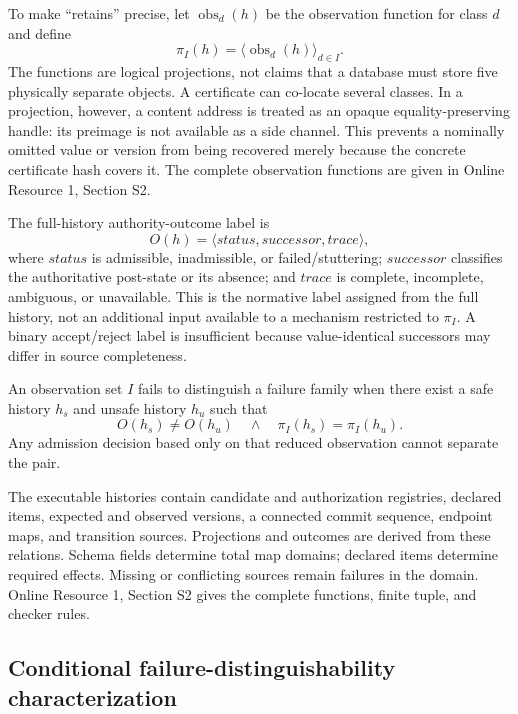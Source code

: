 To make ``retains'' precise, let $\operatorname{obs}_d(h)$ be the observation function for class $d$ and define
\begin{equation}
\pi_I(h)=\langle\operatorname{obs}_d(h)\rangle_{d\in I}.
\label{eq:observation-projection}
\end{equation}
The functions are logical projections, not claims that a database must store five physically separate objects. A certificate can co-locate several classes. In a projection, however, a content address is treated as an opaque equality-preserving handle: its preimage is not available as a side channel. This prevents a nominally omitted value or version from being recovered merely because the concrete certificate hash covers it. The complete observation functions are given in Online Resource 1, Section S2.

The full-history authority-outcome label is
\begin{equation}
O(h)=\langle status,successor,trace\rangle,
\label{eq:outcome}
\end{equation}
where $status$ is admissible, inadmissible, or failed/stuttering; $successor$ classifies the authoritative post-state or its absence; and $trace$ is complete, incomplete, ambiguous, or unavailable. This is the normative label assigned from the full history, not an additional input available to a mechanism restricted to $\pi_I$. A binary accept/reject label is insufficient because value-identical successors may differ in source completeness.

An observation set $I$ fails to distinguish a failure family when there exist a safe history $h_s$ and unsafe history $h_u$ such that
\begin{equation}
O(h_s)\neq O(h_u)
\quad\land\quad
\pi_I(h_s)=\pi_I(h_u).
\label{eq:indistinguishable}
\end{equation}
Any admission decision based only on that reduced observation cannot separate the pair.


The executable histories contain candidate and authorization registries, declared items, expected and observed versions, a connected commit sequence, endpoint maps, and transition sources. Projections and outcomes are derived from these relations. Schema fields determine total map domains; declared items determine required effects. Missing or conflicting sources remain failures in the domain. Online Resource 1, Section S2 gives the complete functions, finite tuple, and checker rules.

\subsection{Conditional failure-distinguishability characterization}

